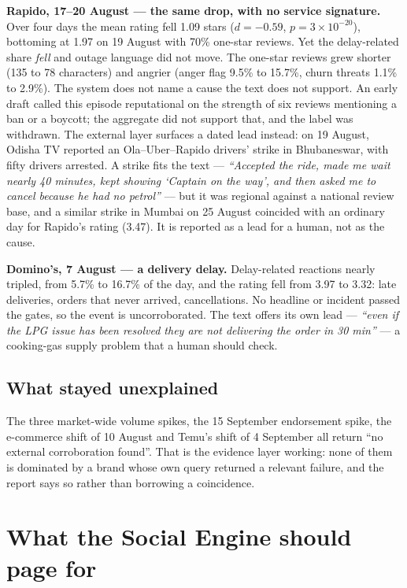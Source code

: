 \documentclass[11pt,a4paper]{article}
\begin{document}
\textbf{Rapido, 17--20 August --- the same drop, with no service signature.} Over four days the mean rating fell 1.09 stars ($d=-0.59$, $p=3\times10^{-20}$), bottoming at 1.97 on 19 August with 70\% one-star reviews. Yet the delay-related share \emph{fell} and outage language did not move. The one-star reviews grew shorter (135 to 78 characters) and angrier (anger flag 9.5\% to 15.7\%, churn threats 1.1\% to 2.9\%). The system does not name a cause the text does not support. An early draft called this episode reputational on the strength of six reviews mentioning a ban or a boycott; the aggregate did not support that, and the label was withdrawn. The external layer surfaces a dated lead instead: on 19 August, Odisha TV reported an Ola--Uber--Rapido drivers' strike in Bhubaneswar, with fifty drivers arrested. A strike fits the text --- \emph{``Accepted the ride, made me wait nearly 40 minutes, kept showing `Captain on the way', and then asked me to cancel because he had no petrol''} --- but it was regional against a national review base, and a similar strike in Mumbai on 25 August coincided with an ordinary day for Rapido's rating (3.47). It is reported as a lead for a human, not as the cause.

\textbf{Domino's, 7 August --- a delivery delay.} Delay-related reactions nearly tripled, from 5.7\% to 16.7\% of the day, and the rating fell from 3.97 to 3.32: late deliveries, orders that never arrived, cancellations. No headline or incident passed the gates, so the event is uncorroborated. The text offers its own lead --- \emph{``even if the LPG issue has been resolved they are not delivering the order in 30 min''} --- a cooking-gas supply problem that a human should check.

\subsection{What stayed unexplained}

The three market-wide volume spikes, the 15 September endorsement spike, the e-commerce shift of 10 August and Temu's shift of 4 September all return ``no external corroboration found''. That is the evidence layer working: none of them is dominated by a brand whose own query returned a relevant failure, and the report says so rather than borrowing a coincidence.

\section{What the Social Engine should page for}\label{sec:page}
\end{document}
